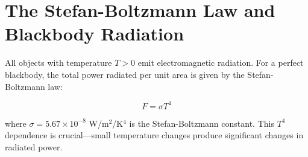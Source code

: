 \documentclass[11pt,a4paper]{article}
\begin{document}
\section{The Stefan-Boltzmann Law and Blackbody Radiation}

All objects with temperature $T > 0$ emit electromagnetic radiation. For a perfect blackbody, the total power radiated per unit area is given by the Stefan-Boltzmann law:

\begin{equation}
F = \sigma T^4
\label{eq:stefan-boltzmann}
\end{equation}

where $\sigma = 5.67 \times 10^{-8}$ W/m$^2$/K$^4$ is the Stefan-Boltzmann constant. This $T^4$ dependence is crucial---small temperature changes produce significant changes in radiated power.
\end{document}
